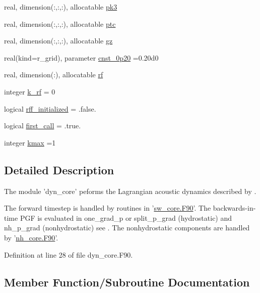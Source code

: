 \begin{DoxyCompactItemize}
\item 
real, dimension(\-:,\-:,\-:), allocatable \hyperlink{classdyn__core__mod_a6d4525d6fbfd6de35414635dd9f0caea}{pk3}
\item 
real, dimension(\-:,\-:,\-:), allocatable \hyperlink{classdyn__core__mod_ada1ed28afc7e672fc62460bb755c7d9c}{ptc}
\item 
real, dimension(\-:,\-:,\-:), allocatable \hyperlink{classdyn__core__mod_add08631b5675064954c9123f29da8d9c}{gz}
\item 
real(kind=r\-\_\-grid), parameter \hyperlink{classdyn__core__mod_af0b6436fcf85fefea9c1020f2f5f7244}{cnst\-\_\-0p20} =0.\-20d0
\item 
real, dimension(\-:), allocatable \hyperlink{classdyn__core__mod_a53c1636fa93f014aa45af25a60d37445}{rf}
\item 
integer \hyperlink{classdyn__core__mod_a3f6a838d346b6bea78aa22d2aaf07023}{k\-\_\-rf} = 0
\item 
logical \hyperlink{classdyn__core__mod_a3ce96984cba7c0b8e6a76a9f855921c8}{rff\-\_\-initialized} = .false.
\item 
logical \hyperlink{classdyn__core__mod_a1dcbe9cc4e2b768f9d5f009c515184b0}{first\-\_\-call} = .true.
\item 
integer \hyperlink{classdyn__core__mod_aabd06b880ef3e9eb74c6cde5107936e6}{kmax} =1
\end{DoxyCompactItemize}


\subsection{Detailed Description}
The module 'dyn\-\_\-core' peforms the Lagrangian acoustic dynamics described by \cite{lin2004vertically}. 

The forward timestep is handled by routines in '\hyperlink{sw__core_8F90}{sw\-\_\-core.\-F90}'. The backwards-\/in-\/time P\-G\-F is evaluated in one\-\_\-grad\-\_\-p or split\-\_\-p\-\_\-grad (hydrostatic) and nh\-\_\-p\-\_\-grad (nonhydrostatic) see \cite{lin1997explicit}. The nonhydrostatic components are handled by '\hyperlink{nh__core_8F90}{nh\-\_\-core.\-F90}'. 

Definition at line 28 of file dyn\-\_\-core.\-F90.



\subsection{Member Function/\-Subroutine Documentation}
